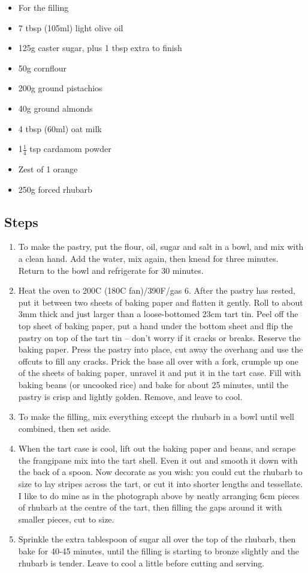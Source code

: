 \documentclass{book}
\begin{document}
\begin{itemize}
\item For the filling
\item 7 tbsp (105ml) light olive oil
\item 125g caster sugar, plus 1 tbsp extra to finish
\item 50g cornflour
\item 200g ground pistachios
\item 40g ground almonds
\item 4 tbsp (60ml) oat milk
\item 1$\frac{1}{4}$ tsp cardamom powder
\item Zest of 1 orange
\item 250g forced rhubarb
\end{itemize}

\subsection*{Steps}
\begin{enumerate}
\item To make the pastry, put the flour, oil, sugar and salt in a bowl, and mix with a clean hand. Add the water, mix again, then knead for three minutes. Return to the bowl and refrigerate for 30 minutes.
\item Heat the oven to 200C (180C fan)/390F/gas 6. After the pastry has rested, put it between two sheets of baking paper and flatten it gently. Roll to about 3mm thick and just larger than a loose-bottomed 23cm tart tin. Peel off the top sheet of baking paper, put a hand under the bottom sheet and flip the pastry on top of the tart tin – don’t worry if it cracks or breaks. Reserve the baking paper. Press the pastry into place, cut away the overhang and use the offcuts to fill any cracks. Prick the base all over with a fork, crumple up one of the sheets of baking paper, unravel it and put it in the tart case. Fill with baking beans (or uncooked rice) and bake for about 25 minutes, until the pastry is crisp and lightly golden. Remove, and leave to cool.
\item To make the filling, mix everything except the rhubarb in a bowl until well combined, then set aside.
\item When the tart case is cool, lift out the baking paper and beans, and scrape the frangipane mix into the tart shell. Even it out and smooth it down with the back of a spoon. Now decorate as you wish: you could cut the rhubarb to size to lay stripes across the tart, or cut it into shorter lengths and tessellate. I like to do mine as in the photograph above by neatly arranging 6cm pieces of rhubarb at the centre of the tart, then filling the gaps around it with smaller pieces, cut to size.
\item Sprinkle the extra tablespoon of sugar all over the top of the rhubarb, then bake for 40-45 minutes, until the filling is starting to bronze slightly and the rhubarb is tender. Leave to cool a little before cutting and serving.
\end{enumerate}
\newpage
\end{document}
